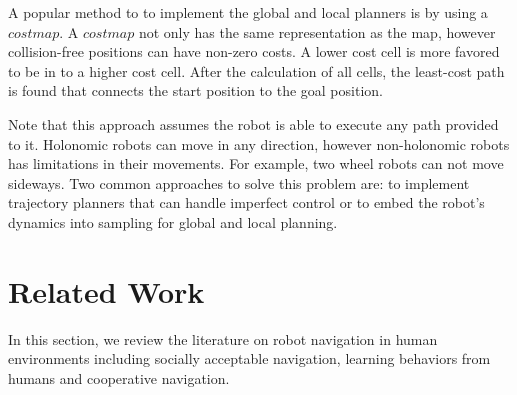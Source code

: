 A popular method to to implement the global and local planners is by using a $costmap$. A $costmap$ not only has the same representation as the map, however collision-free positions can have non-zero costs. A lower cost cell is more favored to be in to a higher cost cell. After the calculation of all cells, the least-cost path is found that connects the start position to the goal position.

Note that this approach assumes the robot is able to execute any path provided to it. Holonomic robots can move in any direction, however non-holonomic robots has limitations in their movements. For example, two wheel robots can not move sideways. Two common approaches to solve this problem are: to implement trajectory planners that can handle imperfect control or to embed the robot's dynamics into sampling for global and local planning.

\section{Related Work}
\label{sec:navigation_related_work}

In this section, we review the literature on robot navigation in human environments including socially acceptable navigation, learning behaviors from humans and cooperative navigation.

